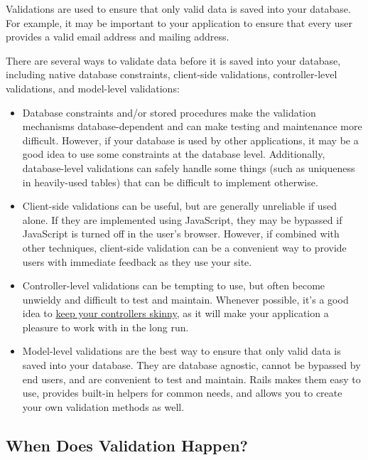 \documentclass[10pt]{book}
\begin{document}
Validations are used to ensure that only valid data is saved into  your database. For example, it may be important to your application to  ensure that every user provides a valid email address and mailing  address.

There are several ways to validate data before it is saved into your  database, including native database constraints, client-side  validations, controller-level validations, and model-level validations:
\begin{itemize}
	\item Database constraints and/or stored procedures make the validation  mechanisms database-dependent and can make testing and maintenance more  difficult. However, if your database is used by other applications, it  may be a good idea to use some constraints at the database level.  Additionally, database-level validations can safely handle some things  (such as uniqueness in heavily-used tables) that can be difficult to  implement otherwise.
	\item Client-side validations can be useful, but are generally unreliable  if used alone. If they are implemented using JavaScript, they may be  bypassed if JavaScript is turned off in the user’s browser. However, if  combined with other techniques, client-side validation can be a  convenient way to provide users with immediate feedback as they use your  site.
	\item Controller-level validations can be tempting to use, but often  become unwieldy and difficult to test and maintain. Whenever possible,  it’s a good idea to \href{http://weblog.jamisbuck.org/2006/10/18/skinny-controller-fat-model}{keep your controllers skinny}, as it will make your application a pleasure to work with in the long run.
	\item Model-level validations are the best way to ensure that only valid  data is saved into your database. They are database agnostic, cannot be  bypassed by end users, and are convenient to test and maintain. Rails  makes them easy to use, provides built-in helpers for common needs, and  allows you to create your own validation methods as well.
\end{itemize}

\subsection{ When Does Validation Happen?}
\end{document}
